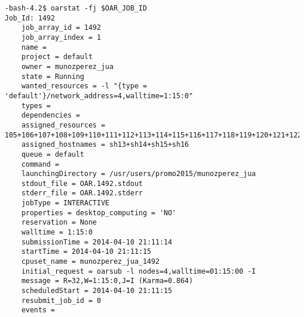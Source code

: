 \begin{verbatim}
-bash-4.2$ oarstat -fj $OAR_JOB_ID
Job_Id: 1492
    job_array_id = 1492
    job_array_index = 1
    name = 
    project = default
    owner = munozperez_jua
    state = Running
    wanted_resources = -l "{type = 'default'}/network_address=4,walltime=1:15:0" 
    types = 
    dependencies = 
    assigned_resources = 105+106+107+108+109+110+111+112+113+114+115+116+117+118+119+120+121+122+123+124+125+126+127+128+129+130+131+132+133+134+135+136
    assigned_hostnames = sh13+sh14+sh15+sh16
    queue = default
    command = 
    launchingDirectory = /usr/users/promo2015/munozperez_jua
    stdout_file = OAR.1492.stdout
    stderr_file = OAR.1492.stderr
    jobType = INTERACTIVE
    properties = desktop_computing = 'NO'
    reservation = None
    walltime = 1:15:0
    submissionTime = 2014-04-10 21:11:14
    startTime = 2014-04-10 21:11:15
    cpuset_name = munozperez_jua_1492
    initial_request = oarsub -l nodes=4,walltime=01:15:00 -I
    message = R=32,W=1:15:0,J=I (Karma=0.864)
    scheduledStart = 2014-04-10 21:11:15
    resubmit_job_id = 0
    events = 

\end{verbatim}
